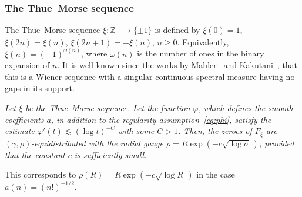 \documentclass[11pt]{amsart}
\numberwithin{equation}{section}
\newcommand{\bZ}{\mathbb Z}
\begin{document}
\subsubsection{The Thue--Morse sequence}
The Thue--Morse sequence $\xi\colon \bZ_+\to \{\pm 1\}$
is defined by $\xi(0)=1$, $\xi(2n)=\xi(n)$, $\xi(2n+1) = - \xi(n)$, $n\ge 0$.
Equivalently, $\xi (n) = (-1)^{\omega (n)}$, where $\omega (n)$ is the number of ones in the binary expansion of $n$. It is well-known since the works by Mahler~\cite{Mahler} and
Kakutani~\cite{Kakutani}, that this is a Wiener sequence with a singular continuous spectral
measure having no gaps in its support.

\medskip{}
{\em
Let $\xi$ be the Thue--Morse sequence.
Let the function $\varphi$, which defines the smooth coefficients $a$,
in addition to the regularity assumption~\eqref{eq:phi}, satisfy the
estimate $\varphi'(t) \lesssim (\log t)^{-C}$ with some $C>1$.
Then, the zeroes of $F_\xi$ are $(\gamma, \rho)$-equidistributed 
with the radial gauge $\rho=R \exp(-c\sqrt{\log\sigma}\,)$, provided that the constant $c$ is sufficiently small.
}
\medskip

This corresponds to $\rho(R) = R \exp(-c\sqrt{\log R}\,)$ in the case $a(n) = (n!)^{-1/2}$.
\end{document}
